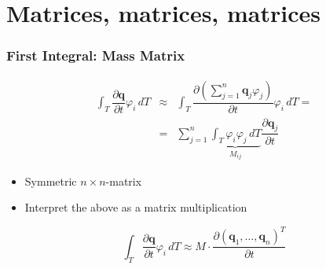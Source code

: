 \documentclass{beamer}
\newcommand{\pd}[2]{\dfrac{\partial #1}{\partial #2}}
\renewcommand{\phi}{\varphi}
\begin{document}
\section{Matrices, matrices, matrices}

\begin{frame}
  \frametitle{First Integral: Mass Matrix}

  \begin{eqnarray*}
    \int_T \pd {\mathbf{q}}{t} \phi_i \, dT &\approx& 
    \int_T \pd {\left( \sum_{j=1}^n \mathbf{q}_j \phi_j \right) }{t} \phi_i \, dT = \\
    &=& \sum_{j=1}^n \underbrace{\int_T \phi_i \phi_j \, dT}_{M_{ij}} \pd{\mathbf{q}_j}{t}
  \end{eqnarray*}
  
  \begin{block}{}
    \begin{itemize}
    \item Symmetric $n \times n$-matrix
    \item Interpret the above as a matrix multiplication
    \end{itemize}
  \end{block}

  \begin{equation*}
    \int_T \pd {\mathbf{q}}{t} \phi_i \, dT \approx
    M \cdot \pd{
        \left( \mathbf{q}_1 , \dots , \mathbf{q}_n  \right)^T }
      {t}
  \end{equation*}
\end{frame}
\end{document}
